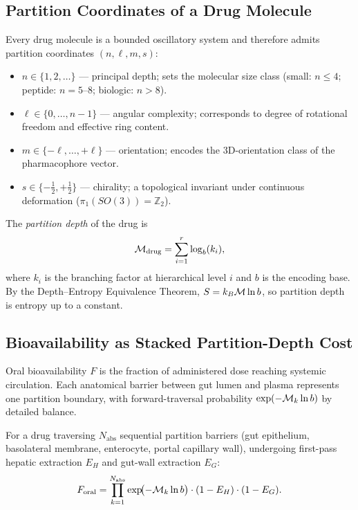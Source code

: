 \subsection{Partition Coordinates of a Drug Molecule}
\label{subsec:ch09-drug-coordinates}

Every drug molecule is a bounded oscillatory system and therefore admits
partition coordinates $(n,\ell,m,s)$:
\begin{itemize}[leftmargin=2em]
  \item $n \in \{1,2,\ldots\}$ --- principal depth; sets the molecular size
    class (small: $n\leq 4$; peptide: $n=5$--$8$; biologic: $n>8$).
  \item $\ell \in \{0,\ldots,n-1\}$ --- angular complexity; corresponds to
    degree of rotational freedom and effective ring content.
  \item $m \in \{-\ell,\ldots,+\ell\}$ --- orientation; encodes the
    3D-orientation class of the pharmacophore vector.
  \item $s \in \{-\tfrac{1}{2},+\tfrac{1}{2}\}$ --- chirality; a topological
    invariant under continuous deformation ($\pi_1(SO(3))=\mathbb{Z}_2$).
\end{itemize}
The \emph{partition depth} of the drug is
\begin{equation}
  \mathcal{M}_{\mathrm{drug}} = \sum_{i=1}^{r}\log_b(k_i),
  \label{eq:ch09-drug-depth}
\end{equation}
where $k_i$ is the branching factor at hierarchical level $i$ and $b$ is the
encoding base.  By the Depth--Entropy Equivalence Theorem, $S = k_B \mathcal{M}
\ln b$, so partition depth is entropy up to a constant.

\subsection{Bioavailability as Stacked Partition-Depth Cost}
\label{subsec:ch09-bioavail-ext}

Oral bioavailability $F$ is the fraction of administered dose reaching
systemic circulation.  Each anatomical barrier between gut lumen and plasma
represents one partition boundary, with forward-traversal probability
$\exp(-\mathcal{M}_k \ln b)$ by detailed balance.

\begin{theorem}
\label{thm:ch09-bioavail-ext}
For a drug traversing $N_{\mathrm{abs}}$ sequential partition barriers
(gut epithelium, basolateral membrane, enterocyte, portal capillary wall),
undergoing first-pass hepatic extraction $E_H$ and gut-wall extraction $E_G$:
\begin{equation}
  F_{\mathrm{oral}} = \prod_{k=1}^{N_{\mathrm{abs}}}
      \exp\!\bigl(-\mathcal{M}_k\ln b\bigr)\cdot(1-E_H)\cdot(1-E_G).
  \label{eq:ch09-F-oral-ext}
\end{equation}
\end{theorem}


